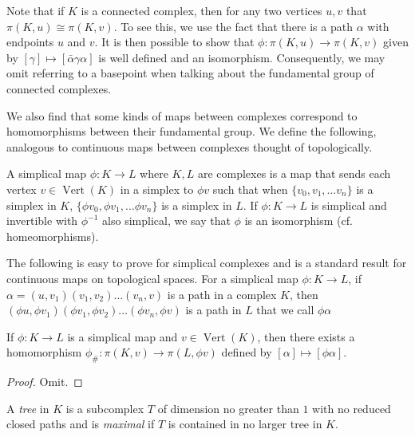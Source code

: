 Note that if $K$ is a connected complex, then for any two vertices $u,v$ that $\pi(K,u) \cong \pi(K,v)$. To see this, we use the fact that there is a path $\alpha$ with endpoints $u$ and $v$. It is then possible to show that $\phi : \pi(K,u) \rightarrow \pi(K,v)$ given by $[\gamma] \mapsto [\bar{\alpha} \gamma \alpha]$ is well defined and an isomorphism. %
Consequently, we may omit referring to a basepoint when talking about the fundamental group of connected complexes.

We also find that some kinds of maps between complexes correspond to homomorphisms between their fundamental group. We define the following, analogous to continuous maps between complexes thought of topologically.

\begin{definition}
  A simplical map $\phi:K \rightarrow L$ where $K,L$ are complexes is a map that sends each vertex $v \in \operatorname{Vert}(K)$ in a simplex to $\phi v$ such that when $\{ v_0, v_1, \dots v_n \}$ is a simplex in $K$, $\{\phi v_0, \phi v_1, \dots \phi v_n\}$ is a simplex in $L$. If $\phi:K \rightarrow L$ is simplical and invertible with $\phi^{-1}$ also simplical, we say that $\phi$ is an isomorphism (cf. homeomorphisms).
\end{definition}

The following is easy to prove for simplical complexes and is a standard result for continuous maps on topological spaces. For a simplical map $\phi:K \rightarrow L$, if $\alpha = (u,v_1)(v_1,v_2) \dots (v_n,v)$ is a path in a complex $K$, then $(\phi u,\phi v_1)(\phi v_1,\phi v_2) \dots (\phi v_n,\phi v)$ is a path in $L$ that we call $\phi \alpha$

\begin{theorem}
  If $\phi:K \rightarrow L$ is a simplical map and $v \in \operatorname{Vert}(K)$, then there exists a homomorphism $\phi_{\#}:\pi(K,v) \rightarrow \pi(L,\phi v)$ defined by $[\alpha] \mapsto [\phi \alpha]$.
\end{theorem}

\begin{proof}
Omit.  
\end{proof}

\begin{definition}
  A \emph{tree} in $K$ is a subcomplex $T$ of dimension no greater than $1$ with no reduced closed paths and is \emph{maximal} if $T$ is contained in no larger tree in $K$.
\end{definition}

